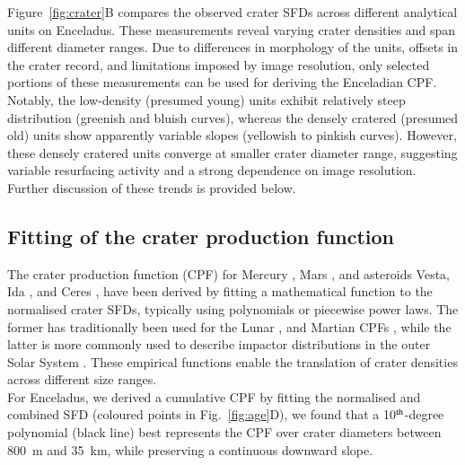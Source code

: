 \documentclass[preprint,11pt,3p,times,authoryear]{elsarticle}
\begin{document}
Figure~\ref{fig:crater}B compares the observed crater SFDs across different analytical units on Enceladus. These measurements reveal varying crater densities and span different diameter ranges. Due to differences in morphology of the units, offsets in the crater record, and limitations imposed by image resolution, only selected portions of these measurements can be used for deriving the Enceladian CPF. Notably, the low-density (presumed young) units exhibit relatively steep distribution (greenish and bluish curves), whereas the densely cratered (presumed old) units show apparently variable slopes (yellowish to pinkish curves). However, these densely cratered units converge at smaller crater diameter range, suggesting variable resurfacing activity and a strong dependence on image resolution. Further discussion of these trends is provided below.

\subsection{Fitting of the crater production function}
\label{subsec:fitting}
The crater production function (CPF) for Mercury \citep{Neukum2001}, Mars \citep{Ivanov2001, Hartmann2005}, and asteroids Vesta, Ida \citep{Schmedemann2014}, and Ceres \citep{Hiesinger2016}, have been derived by fitting a mathematical function to the normalised crater SFDs, typically using polynomials or piecewise power laws. The former has traditionally been used for the Lunar \citep{Neukum2001}, and Martian CPFs \citep{Ivanov2001}, while the latter is more commonly used to describe impactor distributions in the outer Solar System \citep{Zahnle2003}. These empirical functions enable the translation of crater densities across different size ranges. \\

For Enceladus, we derived a cumulative CPF by fitting the normalised and combined SFD (coloured points in Fig.~\ref{fig:age}D), we found that a 10$^{\rm th}$-degree polynomial (black line) best represents the CPF over crater diameters between 800~m and 35~km, while preserving a continuous downward slope.\\
\end{document}
